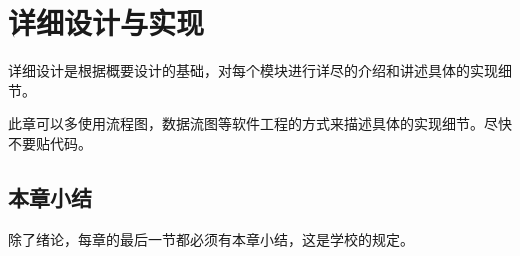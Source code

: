 \chapter{详细设计与实现}

详细设计是根据概要设计的基础，对每个模块进行详尽的介绍和讲述具体的实现细节。

此章可以多使用流程图，数据流图等软件工程的方式来描述具体的实现细节。尽快不要贴代码。

\section{本章小结}

除了绪论，每章的最后一节都必须有本章小结，这是学校的规定。